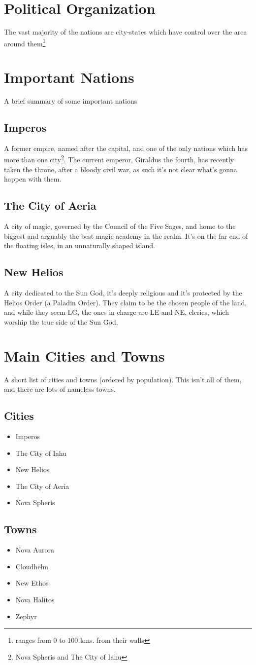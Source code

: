 \section{Political Organization}
The vast majority of the nations are city-states which have control over the area around them\footnote{ranges from 0 to 100 kms. from their walls}

\section{Important Nations}
A brief summary of some important nations

\subsection{Imperos}
A former empire, named after the capital, and one of the only nations which has more than one city\footnote{Nova Spheris and The City of Iahu}. The current emperor, Giraldus the fourth, has recently taken the throne, after a bloody civil war, as such it's not clear what's gonna happen with them.

\subsection{The City of Aeria}
A city of magic, governed by the Council of the Five Sages, and home to the biggest and arguably the best magic academy in the realm. It's on the far end of the floating isles, in an unnaturally shaped island.

\subsection{New Helios}
A city dedicated to the Sun God, it's deeply religious and it's protected by the Helios Order (a Paladin Order). They claim to be the chosen people of the land, and while they seem LG, the ones in charge are LE and NE, clerics, which worship the true side of the Sun God.

\section{Main Cities and Towns}
A short list of cities and towns (ordered by population). This isn't all of them, and there are lots of nameless towns.
\subsection{Cities}
\begin{itemize}
    \item Imperos
    \item The City of Iahu
    \item New Helios
    \item The City of Aeria
    \item Nova Spheris
\end{itemize}
\subsection{Towns}
\begin{itemize}
    \item Nova Aurora
    \item Cloudhelm
    \item New Ethos
    \item Nova Halitos
    \item Zephyr
\end{itemize}

